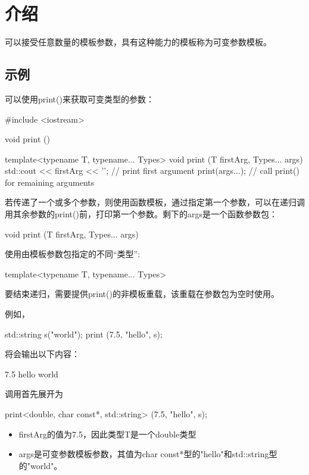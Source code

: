 \section{介绍}


可以接受任意数量的模板参数，具有这种能力的模板称为可变参数模板。

\subsection{示例}

可以使用print()来获取可变类型的参数：

\begin{cpp}
#include <iostream>

void print ()
{
}

template<typename T, typename... Types>
void print (T firstArg, Types... args)
{
	std::cout << firstArg << '\n'; // print first argument
	print(args...); // call print() for remaining arguments
}
\end{cpp}

若传递了一个或多个参数，则使用函数模板，通过指定第一个参数，可以在递归调用其余参数的print()前，打印第一个参数。剩下的args是一个函数参数包：

\begin{cpp}
void print (T firstArg, Types... args)
\end{cpp}

使用由模板参数包指定的不同“类型”:

\begin{cpp}
template<typename T, typename... Types>
\end{cpp}

要结束递归，需要提供print()的非模板重载，该重载在参数包为空时使用。

例如，

\begin{cpp}
std::string s("world");
print (7.5, "hello", s);
\end{cpp}

将会输出以下内容：

\begin{shell}
7.5
hello
world
\end{shell}

调用首先展开为

\begin{cpp}
print<double, char const*, std::string> (7.5, "hello", s);
\end{cpp}

\begin{itemize}
\item 
firstArg的值为7.5，因此类型T是一个double类型

\item 
args是可变参数模板参数，其值为char const*型的"hello"和std::string型的"world"。
\end{itemize}

